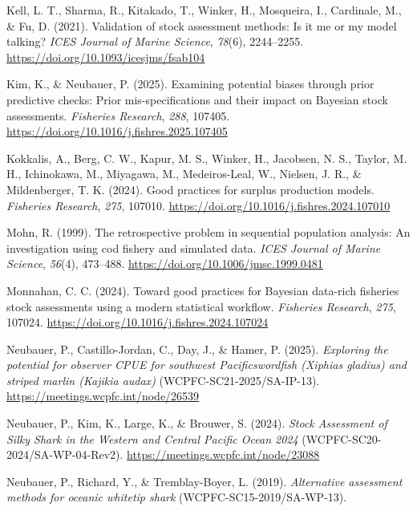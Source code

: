 \documentclass[
  11pt,
]{SCreport}
\newlength{\cslhangindent}
\newenvironment{CSLReferences}[2] %
 {\begin{list}{}{%
  \setlength{\itemindent}{0pt}
  \setlength{\leftmargin}{0pt}
  \setlength{\parsep}{0pt}
  \ifodd #1
   \setlength{\leftmargin}{\cslhangindent}
   \setlength{\itemindent}{-1\cslhangindent}
  \fi
  \setlength{\itemsep}{#2\baselineskip}}}
 {\end{list}}
\begin{document}
\begin{CSLReferences}{1}{0}
Kell, L. T., Sharma, R., Kitakado, T., Winker, H., Mosqueira, I.,
Cardinale, M., \& Fu, D. (2021). Validation of stock assessment methods:
Is it me or my model talking? \emph{ICES Journal of Marine Science},
\emph{78}(6), 2244--2255. \url{https://doi.org/10.1093/icesjms/fsab104}

Kim, K., \& Neubauer, P. (2025). Examining potential biases through
prior predictive checks: {Prior} mis-specifications and their impact on
{Bayesian} stock assessments. \emph{Fisheries Research}, \emph{288},
107405. \url{https://doi.org/10.1016/j.fishres.2025.107405}

Kokkalis, A., Berg, C. W., Kapur, M. S., Winker, H., Jacobsen, N. S.,
Taylor, M. H., Ichinokawa, M., Miyagawa, M., Medeiros-Leal, W., Nielsen,
J. R., \& Mildenberger, T. K. (2024). Good practices for surplus
production models. \emph{Fisheries Research}, \emph{275}, 107010.
\url{https://doi.org/10.1016/j.fishres.2024.107010}

Mohn, R. (1999). The retrospective problem in sequential population
analysis: {An} investigation using cod fishery and simulated data.
\emph{ICES Journal of Marine Science}, \emph{56}(4), 473--488.
\url{https://doi.org/10.1006/jmsc.1999.0481}

Monnahan, C. C. (2024). Toward good practices for {Bayesian} data-rich
fisheries stock assessments using a modern statistical workflow.
\emph{Fisheries Research}, \emph{275}, 107024.
\url{https://doi.org/10.1016/j.fishres.2024.107024}

Neubauer, P., Castillo-Jordan, C., Day, J., \& Hamer, P. (2025).
\emph{Exploring the potential for observer {CPUE} for southwest
{Pacificswordfish} (\emph{{Xiphias} gladius}) and striped marlin
(\emph{{Kajikia} audax})} (WCPFC-SC21-2025/SA-IP-13).
\url{https://meetings.wcpfc.int/node/26539}

Neubauer, P., Kim, K., Large, K., \& Brouwer, S. (2024). \emph{Stock
{Assessment} of {Silky} {Shark} in the {Western} and {Central} {Pacific}
{Ocean} 2024} (WCPFC-SC20-2024/SA-WP-04-Rev2).
\url{https://meetings.wcpfc.int/node/23088}

Neubauer, P., Richard, Y., \& Tremblay-Boyer, L. (2019).
\emph{Alternative assessment methods for oceanic whitetip shark}
(WCPFC-SC15-2019/SA-WP-13).


\end{CSLReferences}
\end{document}
